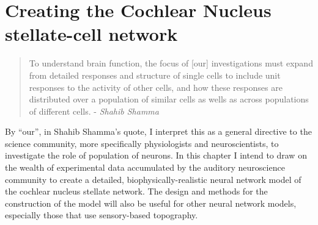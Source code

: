 \documentclass[11pt,a4paper,twoside]{book} %
\begin{document}


\chapter[Simple Responses]{Creating the Cochlear Nucleus stellate-cell network}
\label{sec:SimpleResponsesChapter}


\begin{quotation}

  To understand brain function, the focus of [our] investigations must
  expand from detailed responses and structure of single cells to
  include unit responses to the activity of other cells, and how these
  responses are distributed over a population of similar cells as
  wells as across populations of different cells.  - \emph{Shahib Shamma}

\end{quotation}

By ``our'', in Shahib Shamma's quote, I interpret this as a general
directive to the science community, more specifically physiologists
and neuroscientists, to investigate the role of population of
neurons. In this chapter I intend to draw on the wealth of
experimental data accumulated by the auditory neuroscience community
to create a detailed, biophysically-realistic neural network model of
the cochlear nucleus stellate network.  The design and methods for the
construction of the model will also be useful for other neural network
models, especially those that use sensory-based topography.





\newpage

\newpage

\newpage






\end{document}
